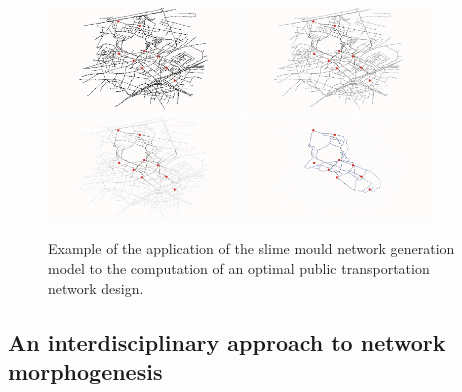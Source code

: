 \begin{figure}
\includegraphics[width=0.45\textwidth]{Figures/PartII/Modeling/NetworkGrowth/tick1}
\includegraphics[width=0.45\textwidth]{Figures/PartII/Modeling/NetworkGrowth/tick20}\\
\includegraphics[width=0.45\textwidth]{Figures/PartII/Modeling/NetworkGrowth/tick50}
\includegraphics[width=0.45\textwidth]{Figures/PartII/Modeling/NetworkGrowth/reseauFinal}
\caption[Biological Network Growth]{Example of the application of the slime mould network generation model to the computation of an optimal public transportation network design.}
\label{fig:slimemould}
\end{figure}






\subsection{An interdisciplinary approach to network morphogenesis}


